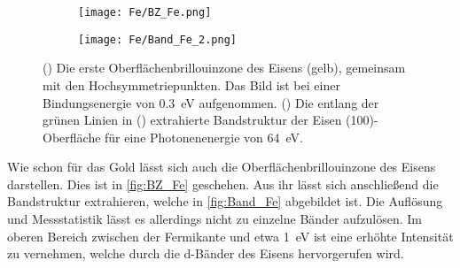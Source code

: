         \begin{figure}
            \begin{subfigure}[t]{0.34\textwidth}
                \centering
                \texttt{[image: Fe/BZ\_Fe.png]}
                \subcaption{}
                \label{fig:BZ_Fe}
            \end{subfigure}
            \begin{subfigure}[t]{0.62\textwidth}
                \centering
                \texttt{[image: Fe/Band\_Fe\_2.png]}
                \subcaption{}
                \label{fig:Band_Fe}
            \end{subfigure}
            \caption{() Die erste Oberflächenbrillouinzone des Eisens (gelb), gemeinsam mit den Hochsymmetriepunkten. Das Bild ist bei einer Bindungsenergie von \SI{0.3}{\electronvolt} aufgenommen.
            () Die entlang der grünen Linien in () extrahierte Bandstruktur der Eisen (100)-Oberfläche für eine Photonenenergie von \SI{64}{\electronvolt}.}
        \end{figure}
        Wie schon für das Gold lässt sich auch die Oberflächenbrillouinzone des Eisens darstellen. 
        Dies ist in \autoref{fig:BZ_Fe} geschehen.
        Aus ihr lässt sich anschließend die Bandstruktur extrahieren, welche in \autoref{fig:Band_Fe} abgebildet ist.
        Die Auflösung und Messstatistik lässt es allerdings nicht zu einzelne Bänder aufzulösen. %
        Im oberen Bereich zwischen der Fermikante und etwa \SI{1}{\electronvolt} ist eine erhöhte Intensität zu vernehmen, welche durch die d-Bänder des Eisens hervorgerufen wird.        

